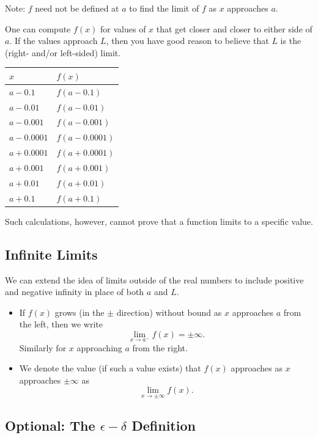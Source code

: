 \documentclass{article}
\theoremstyle{definition}
\theoremstyle{definition}
\begin{document}
\noindent Note: $f$ need not be defined at $a$ to find the limit of $f$ as $x$ approaches $a$.

\vspace{1em}

One can compute $f(x)$ for values of $x$ that get closer and closer to either side of $a$. If the values approach $L$, then you have good reason to believe that $L$ is the (right- and/or left-sided) limit.

\begin{center}
\begin{tabular}{@{}ll@{}}
\toprule[0.4mm]
   $x$        & $f(x)$        \\
\midrule
   $a-0.1$    & $f(a-0.1)$    \\
   $a-0.01$   & $f(a-0.01)$   \\
   $a-0.001$  & $f(a-0.001)$  \\
   $a-0.0001$ & $f(a-0.0001)$ \\
\midrule
   $a+0.0001$ & $f(a+0.0001)$ \\
   $a+0.001$  & $f(a+0.001)$  \\
   $a+0.01$   & $f(a+0.01)$   \\
   $a+0.1$    & $f(a+0.1)$    \\
\bottomrule[0.4mm]
\end{tabular}
\end{center}

Such calculations, however, cannot prove that a function limits to a specific value.

\subsection{Infinite Limits}

We can extend the idea of limits outside of the real numbers to include positive and negative infinity in place of both $a$ and $L$.
\begin{itemize}
\item If $f(x)$ grows (in the $\pm$ direction) without bound as $x$ approaches $a$ from the left, then we write $$\lim_{x\to a^-}f(x)=\pm\infty.$$
Similarly for $x$ approaching $a$ from the right.
\item We denote the value (if such a value exists) that $f(x)$ approaches as $x$ approaches $\pm\infty$ as $$\lim_{x\to\pm\infty} f(x).$$
\end{itemize}



\subsection{Optional: The $\epsilon-\delta$ Definition}
\end{document}
